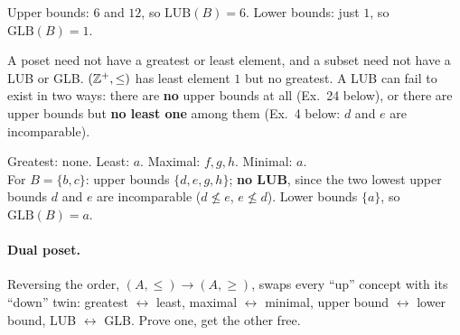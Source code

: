 \documentclass{fkt-notes}
\theoremstyle{definition}
\begin{document}
\begin{example}[Ex.~3: $B=\{1,2,3\}$ in $D_{12}$]
  Upper bounds: $6$ and $12$, so $\mathrm{LUB}(B)=6$. Lower bounds:
  just $1$, so $\mathrm{GLB}(B)=1$.
\end{example}

\begin{keybox}[title={Extremal elements need not exist}]
  A poset need not have a greatest or least element, and a subset need
  not have a LUB or GLB. $(\mathbb{Z}^+,\le)$ has least element $1$ but no
  greatest. A LUB can fail to exist in two ways: there are \textbf{no}
  upper bounds at all (Ex.~24 below), or there are upper bounds but
  \textbf{no least one} among them (Ex.~4 below: $d$ and $e$ are
  incomparable).
\end{keybox}

\begin{example}[Ex.~4]\leavevmode\par\noindent
  \begin{minipage}[t]{0.3\textwidth}
    \vspace{0pt}\centering
  \end{minipage}\hfill
  \begin{minipage}[t]{0.66\textwidth}
    \vspace{0pt}
    Greatest: none. Least: $a$. Maximal: $f,g,h$. Minimal: $a$.\\[2pt]
    For $B=\{b,c\}$: upper bounds $\{d,e,g,h\}$; \textbf{no LUB}, since
    the two lowest upper bounds $d$ and $e$ are incomparable
    ($d\not\le e$, $e\not\le d$). Lower bounds $\{a\}$, so
    $\mathrm{GLB}(B)=a$.
  \end{minipage}
\end{example}

\paragraph{Dual poset.} Reversing the order, $(A,\le)\to(A,\ge)$, swaps
every ``up'' concept with its ``down'' twin: greatest $\leftrightarrow$
least, maximal $\leftrightarrow$ minimal, upper bound $\leftrightarrow$
lower bound, LUB $\leftrightarrow$ GLB. Prove one, get the other free.
\end{document}

